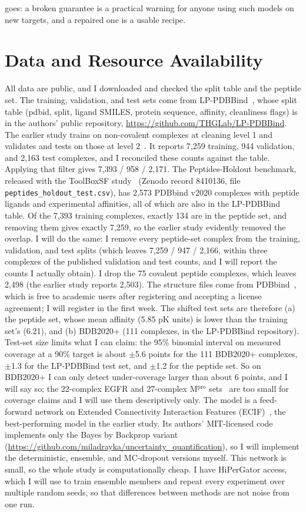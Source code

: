 \documentclass[10pt,twocolumn]{article}
\begin{document}
goes: a broken guarantee is a practical warning for anyone using such models on new targets, and a repaired one is a usable recipe.

\section{Data and Resource Availability}

All data are public, and I downloaded and checked the split table and the peptide set. The training, validation, and test sets come from LP-PDBBind~\cite{lppdbbind}, whose split table (pdbid, split, ligand SMILES, protein sequence, affinity, cleanliness flags) is in the authors' public repository, \url{https://github.com/THGLab/LP-PDBBind}. The earlier study trains on non-covalent complexes at cleaning level 1 and validates and tests on those at level 2~\cite{rayka2025}. It reports 7,259 training, 944 validation, and 2,163 test complexes, and I reconciled these counts against the table. Applying that filter gives 7,393 / 958 / 2,171. The Peptides-Holdout benchmark, released with the ToolBoxSF study~\cite{durant2025} (Zenodo record 8410136, file \texttt{peptides\_holdout\_test.csv}), has 2,573 PDBbind v2020 complexes with peptide ligands and experimental affinities, all of which are also in the LP-PDBBind table. Of the 7,393 training complexes, exactly 134 are in the peptide set, and removing them gives exactly 7,259, so the earlier study evidently removed the overlap. I will do the same: I remove every peptide-set complex from the training, validation, and test splits (which leaves 7,259 / 947 / 2,166, within three complexes of the published validation and test counts, and I will report the counts I actually obtain). I drop the 75 covalent peptide complexes, which leaves 2,498 (the earlier study reports 2,503). The structure files come from PDBbind~\cite{pdbbind}, which is free to academic users after registering and accepting a license agreement; I will register in the first week. The shifted test sets are therefore (a) the peptide set, whose mean affinity (5.85 pK units) is lower than the training set's (6.21), and (b) BDB2020+ (111 complexes, in the LP-PDBBind repository). Test-set size limits what I can claim: the 95\% binomial interval on measured coverage at a 90\% target is about $\pm$5.6 points for the 111 BDB2020+ complexes, $\pm$1.3 for the LP-PDBBind test set, and $\pm$1.2 for the peptide set. So on BDB2020+ I can only detect under-coverage larger than about 6 points, and I will say so; the 22-complex EGFR and 27-complex M$^{\text{pro}}$ sets~\cite{rayka2025} are too small for coverage claims and I will use them descriptively only. The model is a feed-forward network on Extended Connectivity Interaction Features (ECIF)~\cite{ecif}, the best-performing model in the earlier study. Its authors' MIT-licensed code implements only the Bayes by Backprop variant (\url{https://github.com/miladrayka/uncertainty_quantification}), so I will implement the deterministic, ensemble, and MC-dropout versions myself. This network is small, so the whole study is computationally cheap. I have HiPerGator access, which I will use to train ensemble members and repeat every experiment over multiple random seeds, so that differences between methods are not noise from one run. 
\end{document}
